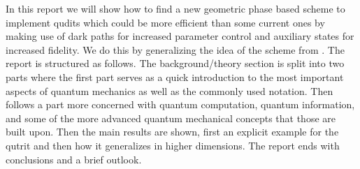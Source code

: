 In this report we will show how to find a new geometric phase based scheme to implement qudits which could be more efficient than some current ones by making use of dark paths for increased parameter control and auxiliary states for increased fidelity. We do this by generalizing the idea of the scheme from \cite{darkpath}. The report is structured as follows. The background/theory section is split into two parts where the first part serves as a quick introduction to the most important aspects of quantum mechanics as well as the commonly used notation. Then follows a part more concerned with quantum computation, quantum information, and some of the more advanced quantum mechanical concepts that those are built upon. Then the main results are shown, first an explicit example for the qutrit and then how it generalizes in higher dimensions. The report ends with conclusions and a brief outlook.


